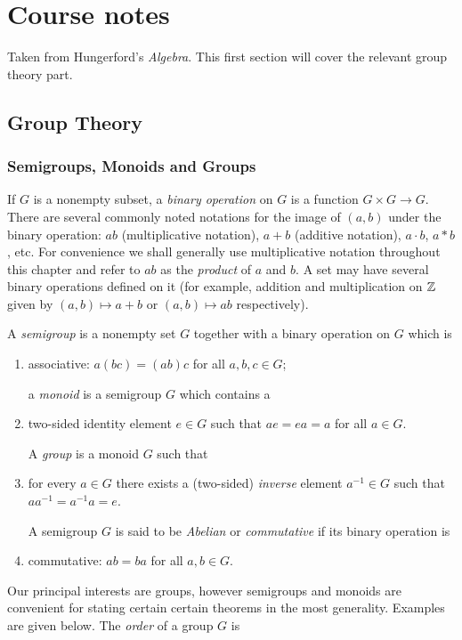 \chapter{Course notes}
Taken from Hungerford's \emph{Algebra}. This first section will cover the
relevant group theory part.
\section{Group Theory}
\subsection{Semigroups, Monoids and Groups}
If $G$ is a nonempty subset, a \emph{binary operation} on $G$ is a function
$G\times G\to G$. There are several commonly noted notations for the image
of $(a,b)$ under the binary operation: $ab$ (multiplicative notation),
$a+b$ (additive notation), $a\cdot b$, $a*b$, etc. For convenience we shall
generally use multiplicative notation throughout this chapter and refer to
$ab$ as the \emph{product} of $a$ and $b$. A set may have several binary
operations defined on it (for example, addition and multiplication on
$\mathbb{Z}$ given by $(a,b)\mapsto a+b$ or $(a,b)\mapsto ab$ respectively).
\begin{definition}
A \emph{semigroup} is a nonempty set $G$ together with a binary operation
on $G$ which is
\begin{enumerate}[label=\textnormal{(\alph*)}]
\item associative: $a(bc)=(ab)c$ for all $a,b,c\in G$;

  \bigskip
  a \emph{monoid}  is a semigroup $G$ which contains a
\item two-sided identity element $e\in G$ such that $ae=ea=a$ for all $a\in
  G$.

  \bigskip
  A \emph{group} is a monoid $G$ such that
\item for every $a\in G$ there exists a (two-sided) \emph{inverse} element
  $a^{-1}\in G$ such that $aa^{-1}=a^{-1}a=e$.

  \bigskip
  A semigroup $G$ is said to be \emph{Abelian} or \emph{commutative} if its
  binary operation is
\item commutative: $ab=ba$ for all $a,b\in G$.
\end{enumerate}
\end{definition}
Our principal interests are groups, however semigroups and monoids are
convenient for stating certain certain theorems in the most
generality. Examples are given below. The \emph{order} of a group $G$ is
